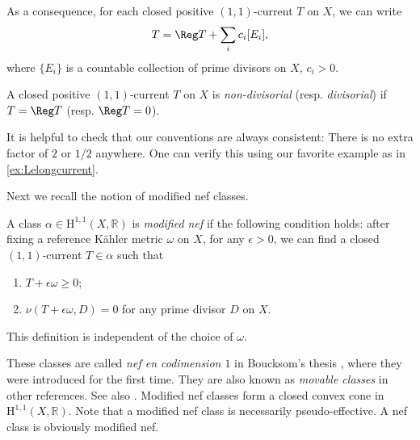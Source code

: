 As a consequence, for each closed positive $(1,1)$-current $T$ on $X$, we can write
\begin{equation}\label{eq:Siudec}
    T=\Reg T+\sum_{i} c_i [E_i],
\end{equation}
where $\{E_i\}$ is a countable collection of prime divisors on $X$, $c_i>0$.

\begin{definition}\label{def:nd_curr}
    A closed positive $(1,1)$-current $T$ on $X$ is \emph{non-divisorial} (resp. \emph{divisorial}) if $T=\Reg T$ (resp. $\Reg T=0$).
\end{definition}

It is helpful to check that our conventions are always consistent: There is no extra factor of $2$ or $1/2$ anywhere. One can verify this using our favorite example as in \cref{ex:Lelongcurrent}.

Next we recall the notion of modified nef classes.

\begin{definition}\label{def:mnclass}
    A class $\alpha\in \mathrm{H}^{1,1}(X,\mathbb{R})$ is \emph{modified nef} if the following condition holds: after fixing a reference Kähler metric $\omega$ on $X$, for any $\epsilon>0$, we can find a closed $(1,1)$-current $T\in \alpha$ such that
    \begin{enumerate}
        \item\label{itm:def:mnclass:1} $T+\epsilon\omega\geq 0$;
        \item\label{itm:def:mnclass:2} $\nu(T+\epsilon\omega,D)=0$ for any prime divisor $D$ on $X$.
    \end{enumerate}
    This definition is independent of the choice of $\omega$.
\end{definition}
These classes are called \emph{nef en codimension $1$} in Boucksom's thesis \cite{Bou02}, where they were introduced for the first time. They are also known as \emph{movable classes} in other references. See also \cite[Definition~14.3.8]{FPT}.
Modified nef classes form a closed convex cone in $\mathrm{H}^{1,1}(X,\mathbb{R})$. Note that a modified nef class is necessarily pseudo-effective. A nef class is obviously modified nef.

